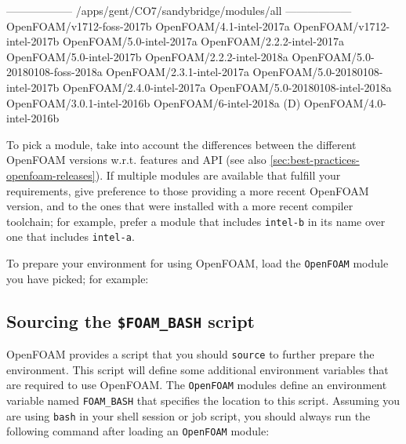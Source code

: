 \begin{prompt}

------------------ /apps/gent/CO7/sandybridge/modules/all ------------------
   OpenFOAM/v1712-foss-2017b     OpenFOAM/4.1-intel-2017a
   OpenFOAM/v1712-intel-2017b    OpenFOAM/5.0-intel-2017a
   OpenFOAM/2.2.2-intel-2017a    OpenFOAM/5.0-intel-2017b
   OpenFOAM/2.2.2-intel-2018a    OpenFOAM/5.0-20180108-foss-2018a
   OpenFOAM/2.3.1-intel-2017a    OpenFOAM/5.0-20180108-intel-2017b
   OpenFOAM/2.4.0-intel-2017a    OpenFOAM/5.0-20180108-intel-2018a
   OpenFOAM/3.0.1-intel-2016b    OpenFOAM/6-intel-2018a            (D)
   OpenFOAM/4.0-intel-2016b
\end{prompt}

To pick a module, take into account the differences between the different OpenFOAM versions w.r.t. features and
API (see also \autoref{sec:best-practices-openfoam-releases}).
If multiple modules are available that fulfill your requirements, give preference to those providing a more recent
OpenFOAM version, and to the ones that were installed with a more recent compiler toolchain; for example, prefer
a module that includes \texttt{intel-\the\year{}b} in its name over one that includes
\texttt{intel-\the\year{}a}.

To prepare your environment for using OpenFOAM, load the \lstinline|OpenFOAM| module you have picked; for example:
\begin{prompt}
\end{prompt}

\subsection{Sourcing the \texttt{\$FOAM\_BASH} script}

OpenFOAM provides a script that you should \lstinline|source| to further prepare the environment.
This script will define some additional environment variables that are required to use OpenFOAM.
The \lstinline|OpenFOAM| modules define an environment variable named \lstinline|FOAM_BASH|
that specifies the location to this script.
Assuming you are using \lstinline|bash| in your shell session or job script,
you should always run the following command after loading an \lstinline|OpenFOAM| module:

\begin{prompt}
\end{prompt}

